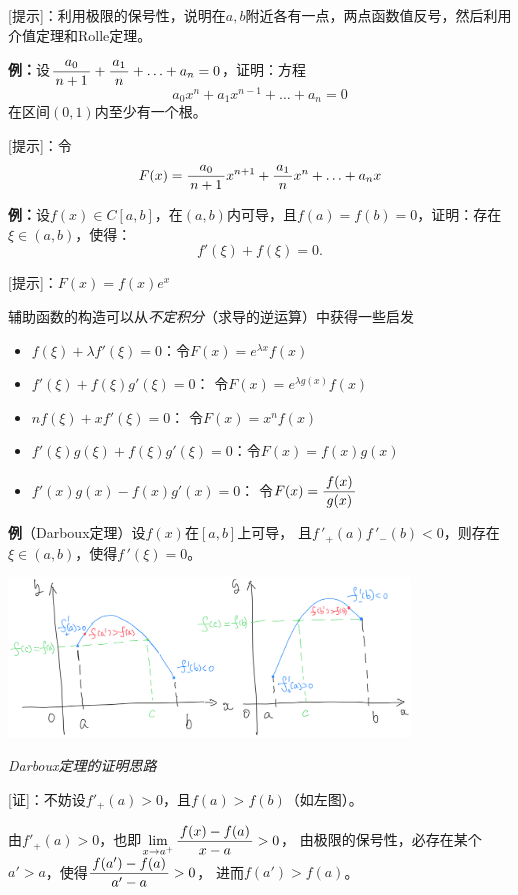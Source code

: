 [提示]：利用极限的保号性，说明在$a,b$附近各有一点，两点函数值反号，然后利用
介值定理和Rolle定理。

{\bf 例：}设$\displaystyle\frac{\,{a_0}\,}{\,{n+1}\,}+\displaystyle\frac{\,{a_1}\,}{\,{n}\,}+\ldots+a_n=0$，证明：方程
$$a_0x^n+a_1x^{n-1}+\ldots+a_n=0$$
在区间$(0,1)$内至少有一个根。

[提示]：令
$$F(x)=\displaystyle\frac{\,{a_0}\,}{\,{n+1}\,}x^{n+1}+\displaystyle\frac{\,{a_1}\,}{\,{n}\,}x^n+\ldots+a_nx$$

{\bf 例：}设$f(x)\in C[a,b]$，在$(a,b)$内可导，且$f(a)=f(b)=0$，证明：存在
$\xi\in(a,b)$，使得：
$$f'(\xi)+f(\xi)=0.$$

[提示]：$F(x)=f(x)e^x$

\begin{thx}
	辅助函数的构造可以从{\it 不定积分}（求导的逆运算）中获得一些启发
	\begin{itemize}
	  \setlength{\itemindent}{1cm}
	  \item $f(\xi)+\lambda f'(\xi)=0$：令$F(x)=e^{\lambda x}f(x)$
	  \item $f'(\xi)+f(\xi)g'(\xi)=0$： 令$F(x)=e^{\lambda g(x)}f(x)$
	  \item $nf(\xi)+xf'(\xi)=0$： 令$F(x)=x^nf(x)$ 
	  \item $f'(\xi)g(\xi)+f(\xi)g'(\xi)=0$：令$F(x)=f(x)g(x)$
	  \item $f'(x)g(x)-f(x)g'(x)=0$： 令$F(x)=\displaystyle\frac{\,{f(x)}\,}{\,{g(x)}\,}$
	\end{itemize}
\end{thx}

{\bf 例}（{\kaishu Darboux定理}）设$f(x)$在$[a,b]$上可导，
且$f\,'_+(a)f\,'_-(b)<0$，则存在$\xi\in(a,b)$，使得$f\,'(\xi)=0$。

\begin{center}
	\includegraphics[width=0.8\textwidth]{./images/ch3/Darboux.jpg}
	
	\it Darboux定理的证明思路
\end{center}

[证]：不妨设$f'_+(a)>0$，且$f(a)>f(b)$（如左图）。

由$f'_+(a)>0$，也即$\lim\limits_{x\to{a^+}}\displaystyle\frac{\,{f(x)-f(a)}\,}{\,{x-a}\,}>0$，
由极限的保号性，必存在某个$a'>a$，使得$\displaystyle\frac{\,{f(a')-f(a)}\,}{\,{a'-a}\,}>0$，
进而$f(a')>f(a)$。

